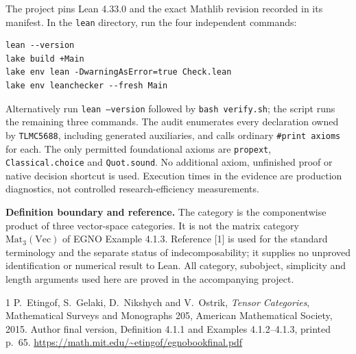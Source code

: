 \documentclass[11pt,a4paper]{article}
\begin{document}
The project pins Lean 4.33.0 and the exact Mathlib revision recorded in its
manifest. In the \texttt{lean} directory, run the four independent commands:
\begin{verbatim}
lean --version
lake build +Main
lake env lean -DwarningAsError=true Check.lean
lake env leanchecker --fresh Main
\end{verbatim}
Alternatively run \texttt{lean --version} followed by \texttt{bash verify.sh};
the script runs the remaining three commands. The audit enumerates every
declaration owned by \texttt{TLMC5688}, including generated auxiliaries, and calls
ordinary \texttt{\#print axioms} for each. The only permitted foundational axioms
are \texttt{propext}, \texttt{Classical.choice} and \texttt{Quot.sound}.
No additional axiom, unfinished proof or native decision shortcut is used.
Execution times in the evidence are production diagnostics, not controlled
research-efficiency measurements.

\textbf{Definition boundary and reference.}
The category is the componentwise product of three vector-space categories. It
is not the matrix category $\mathrm{Mat}_3(\mathrm{Vec})$ of EGNO Example 4.1.3.
Reference [1] is used for the standard terminology and the separate status of
indecomposability; it supplies no unproved identification or numerical result to
Lean. All category, subobject, simplicity and length arguments used here are
proved in the accompanying project.

\begin{thebibliography}{1}
 P.~Etingof, S.~Gelaki, D.~Nikshych and V.~Ostrik,
\emph{Tensor Categories}, Mathematical Surveys and Monographs 205,
American Mathematical Society, 2015. Author final version,
Definition 4.1.1 and Examples 4.1.2--4.1.3, printed p.~65.
\url{https://math.mit.edu/~etingof/egnobookfinal.pdf}
\end{thebibliography}
\end{document}
